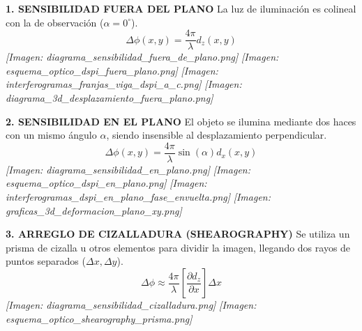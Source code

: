 \documentclass[12pt]{article}
\begin{document}
	\textbf{1. SENSIBILIDAD FUERA DEL PLANO}
	La luz de iluminación es colineal con la de observación ($\alpha=0^\circ$).
	\begin{equation*}
		\Delta\phi(x,y) = \frac{4\pi}{\lambda}d_z(x,y)
	\end{equation*}
	\textit{[Imagen: diagrama\_sensibilidad\_fuera\_de\_plano.png]}
	\textit{[Imagen: esquema\_optico\_dspi\_fuera\_plano.png]}
	\textit{[Imagen: interferogramas\_franjas\_viga\_dspi\_a\_c.png]}
	\textit{[Imagen: diagrama\_3d\_desplazamiento\_fuera\_plano.png]}
	
	\textbf{2. SENSIBILIDAD EN EL PLANO}
	El objeto se ilumina mediante dos haces con un mismo ángulo $\alpha$, siendo insensible al desplazamiento perpendicular.
	\begin{equation*}
		\Delta\phi(x,y) = \frac{4\pi}{\lambda} \sin(\alpha) d_x(x,y)
	\end{equation*}
	\textit{[Imagen: diagrama\_sensibilidad\_en\_plano.png]}
	\textit{[Imagen: esquema\_optico\_dspi\_en\_plano.png]}
	\textit{[Imagen: interferogramas\_dspi\_en\_plano\_fase\_envuelta.png]}
	\textit{[Imagen: graficas\_3d\_deformacion\_plano\_xy.png]}
	
	\textbf{3. ARREGLO DE CIZALLADURA (SHEAROGRAPHY)}
	Se utiliza un prisma de cizalla u otros elementos para dividir la imagen, llegando dos rayos de puntos separados ($\Delta x, \Delta y$).
	\begin{equation*}
		\Delta\phi \approx \frac{4\pi}{\lambda} \left[ \frac{\partial d_z}{\partial x} \right] \Delta x
	\end{equation*}
	\textit{[Imagen: diagrama\_sensibilidad\_cizalladura.png]}
	\textit{[Imagen: esquema\_optico\_shearography\_prisma.png]}
	
\end{document}
